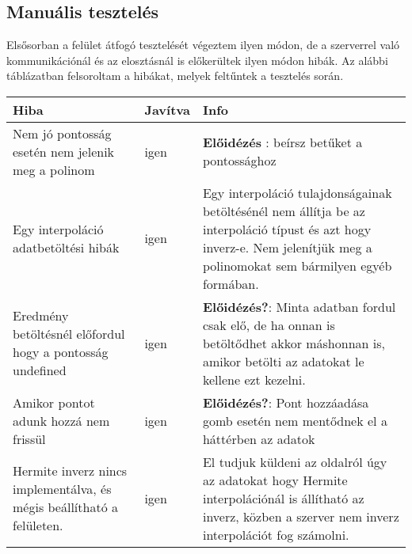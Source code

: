 \subsection{Manuális tesztelés}
	Elsősorban a felület átfogó tesztelését végeztem ilyen módon, de a szerverrel való kommunikációnál és az elosztásnál is előkerültek ilyen módon hibák. \newline
	Az alábbi táblázatban felsoroltam a hibákat, melyek feltűntek a tesztelés során. 
	\begin{center}
  	\begin{tabular}{| p{4cm} | p{1.5cm} | p{8cm} |}
    \hline
    Hiba & Javítva & Info
  	\\ \hline
        Nem jó pontosság esetén nem jelenik meg a polinom
      &
      	igen
      &
		\textbf{Előidézés} : beírsz betűket a pontossághoz 
    \\ \hline
        Egy interpoláció adatbetöltési hibák
      &
      	igen
      &
      	Egy interpoláció tulajdonságainak betöltésénél nem állítja be az interpoláció típust és azt hogy inverz-e.
      	Nem jelenítjük meg a polinomokat sem bármilyen egyéb formában.
    \\ \hline
        Eredmény betöltésnél előfordul hogy a pontosság undefined 
      &
      	igen
      &
		\textbf{Előidézés?}:  Minta adatban fordul csak elő, de ha onnan  is betöltődhet akkor máshonnan is, amikor betölti az adatokat le kellene ezt kezelni.
   \\ \hline
    	Amikor pontot adunk hozzá nem frissül 
      &
      	igen
      &
		\textbf{Előidézés?}: Pont hozzáadása gomb esetén nem mentődnek el a háttérben az adatok
    \\ \hline
    	Hermite inverz nincs implementálva, és mégis beállítható a felületen.  
      &
      	igen
      &
		El tudjuk küldeni az oldalról úgy az adatokat hogy Hermite interpolációnál is állítható az inverz, közben a szerver nem inverz interpolációt fog számolni.
	\\ \hline
  \end{tabular}\end{center}

